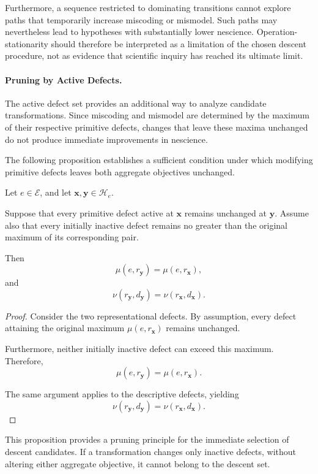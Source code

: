 Furthermore, a sequence restricted to dominating
transitions cannot explore paths that temporarily
increase miscoding or mismodel. Such paths may
nevertheless lead to hypotheses with substantially
lower nescience. Operation-stationarity should
therefore be interpreted as a limitation of the
chosen descent procedure, not as evidence that
scientific inquiry has reached its ultimate limit.

\paragraph{Pruning by Active Defects.}

The active defect set provides an additional way
to analyze candidate transformations. Since
miscoding and mismodel are determined by the
maximum of their respective primitive defects,
changes that leave these maxima unchanged do
not produce immediate improvements in nescience.

The following proposition establishes a sufficient
condition under which modifying primitive defects
leaves both aggregate objectives unchanged.

\begin{proposition}
\label{prop:inactive_defect_no_change}
Let $e\in\mathcal E$, and let
$\mathbf{x},\mathbf{y}\in\mathcal H_e$.

Suppose that every primitive defect active at
$\mathbf{x}$ remains unchanged at $\mathbf{y}$.
Assume also that every initially inactive defect
remains no greater than the original maximum
of its corresponding pair.

Then
\[
\mu(e,r_{\mathbf{y}})
=
\mu(e,r_{\mathbf{x}}),
\]
and
\[
\nu(r_{\mathbf{y}},d_{\mathbf{y}})
=
\nu(r_{\mathbf{x}},d_{\mathbf{x}}).
\]
\end{proposition}

\begin{proof}
Consider the two representational defects.
By assumption, every defect attaining the
original maximum $\mu(e,r_{\mathbf{x}})$
remains unchanged.

Furthermore, neither initially inactive defect
can exceed this maximum. Therefore,
\[
\mu(e,r_{\mathbf{y}})
=
\mu(e,r_{\mathbf{x}}).
\]

The same argument applies to the descriptive
defects, yielding
\[
\nu(r_{\mathbf{y}},d_{\mathbf{y}})
=
\nu(r_{\mathbf{x}},d_{\mathbf{x}}).
\]
\end{proof}

This proposition provides a pruning principle
for the immediate selection of descent candidates.
If a transformation changes only inactive defects,
without altering either aggregate objective, it
cannot belong to the descent set.

